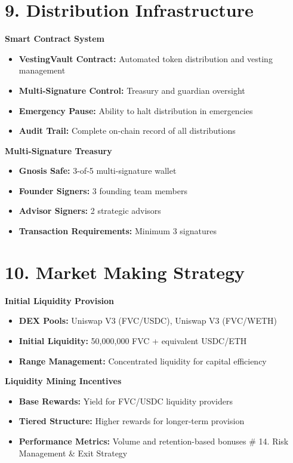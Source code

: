\documentclass[
  paper=a4,
  ,captions=tableheading
]{scrartcl}
\providecommand{\tightlist}{%
  \setlength{\itemsep}{0pt}\setlength{\parskip}{0pt}}
\begin{document}
\section{9. Distribution
Infrastructure}\label{distribution-infrastructure}

\textbf{Smart Contract System}

\begin{itemize}
\tightlist
\item
  \textbf{VestingVault Contract:} Automated token distribution and
  vesting management
\item
  \textbf{Multi-Signature Control:} Treasury and guardian oversight
\item
  \textbf{Emergency Pause:} Ability to halt distribution in emergencies
\item
  \textbf{Audit Trail:} Complete on-chain record of all distributions
\end{itemize}

\textbf{Multi-Signature Treasury}

\begin{itemize}
\tightlist
\item
  \textbf{Gnosis Safe:} 3-of-5 multi-signature wallet
\item
  \textbf{Founder Signers:} 3 founding team members
\item
  \textbf{Advisor Signers:} 2 strategic advisors
\item
  \textbf{Transaction Requirements:} Minimum 3 signatures
\end{itemize}

\section{10. Market Making Strategy}\label{market-making-strategy}

\textbf{Initial Liquidity Provision}

\begin{itemize}
\tightlist
\item
  \textbf{DEX Pools:} Uniswap V3 (FVC/USDC), Uniswap V3 (FVC/WETH)
\item
  \textbf{Initial Liquidity:} 50,000,000 FVC + equivalent USDC/ETH
\item
  \textbf{Range Management:} Concentrated liquidity for capital
  efficiency
\end{itemize}

\textbf{Liquidity Mining Incentives}

\begin{itemize}
\tightlist
\item
  \textbf{Base Rewards:} Yield for FVC/USDC liquidity providers
\item
  \textbf{Tiered Structure:} Higher rewards for longer-term provision
\item
  \textbf{Performance Metrics:} Volume and retention-based bonuses \#
  14. Risk Management \& Exit Strategy
\end{itemize}
\end{document}
